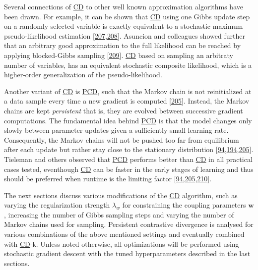 \documentclass[11pt,a4paper,twoside]{book}
\newcommand{\w}{\mathbf{w}}
\theoremstyle{definition}
\theoremstyle{definition}
\theoremstyle{remark}
\begin{document}
Several connections of \protect\hyperlink{abbrev}{CD} to other well
known approximation algorithms have been drawn. For example, it can be
shown that \protect\hyperlink{abbrev}{CD} using one Gibbs update step on
a randomly selected variable is exactly equivalent to a stochastic
maximum pseudo-likelihood estimation
{[}\protect\hyperlink{ref-Hyvarinen2006}{207},\protect\hyperlink{ref-Hyvarinen2007}{208}{]}.
Asuncion and colleagues showed further that an arbitrary good
approximation to the full likelihood can be reached by applying
blocked-Gibbs sampling {[}\protect\hyperlink{ref-Asuncion2010}{209}{]}.
\protect\hyperlink{abbrev}{CD} based on sampling an arbitraty number of
variables, has an equivalent stochastic composite likelihood, which is a
higher-order generalization of the pseudo-likelihood.

Another variant of \protect\hyperlink{abbrev}{CD} is
\protect\hyperlink{abbrev}{PCD}, such that the Markov chain is not
reinitialized at a data sample every time a new gradient is computed
{[}\protect\hyperlink{ref-Tieleman2008}{205}{]}. Instead, the Markov
chains are kept \emph{persistent} that is, they are evolved between
successive gradient computations. The fundamental idea behind
\protect\hyperlink{abbrev}{PCD} is that the model changes only slowly
between parameter updates given a sufficiently small learning rate.
Consequently, the Markov chains will not be pushed too far from
equilibrium after each update but rather stay close to the stationary
distribution
{[}\protect\hyperlink{ref-Murphy2012}{94},\protect\hyperlink{ref-Fischer2012}{194},\protect\hyperlink{ref-Tieleman2008}{205}{]}.
Tieleman and others observed that \protect\hyperlink{abbrev}{PCD}
performs better than \protect\hyperlink{abbrev}{CD} in all practical
cases tested, eventhough \protect\hyperlink{abbrev}{CD} can be faster in
the early stages of learning and thus should be preferred when runtime
is the limiting factor
{[}\protect\hyperlink{ref-Murphy2012}{94},\protect\hyperlink{ref-Tieleman2008}{205},\protect\hyperlink{ref-Swersky2010}{210}{]}.

The next sections discuss various modifications of the
\protect\hyperlink{abbrev}{CD} algorithm, such as varying the
regularization strength \(\lambda_w\) for constraining the coupling
parameters \(\w\), increasing the number of Gibbs sampling steps and
varying the number of Markov chains used for sampling. Persistent
contrastive divergence is analysed for various combinations of the above
mentioned settings and eventually combined with
\protect\hyperlink{abbrev}{CD}-k. Unless noted otherwise, all
optimizations will be performed using stochastic gradient descent with
the tuned hyperparameters described in the last sections.
\end{document}
